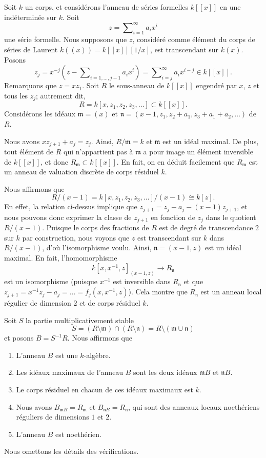 \medskip\noindent
Soit $k$ un corps, et considérons l'anneau de séries formelles
$k[[x]]$ en une indéterminée sur $k$. Soit
$$
z = \sum\nolimits_{i = 1}^\infty a_i x^i
$$
une série formelle. Nous supposons que $z$, considéré comme élément du corps
de séries de Laurent $k((x)) = k[[x]][1/x]$, est transcendant sur $k(x)$.
Posons
$$
z_j
=
x^{-j}(z - \sum\nolimits_{i = 1, \ldots, j - 1} a_i x^i)
=
\sum\nolimits_{i = j}^\infty a_i x^{i - j}
\in k[[x]].
$$
Remarquons que $z = xz_1$.
Soit $R$ le sous-anneau de $k[[x]]$ engendré par $x$, $z$ et tous les
$z_j$; autrement dit,
$$
R = k[x, z_1, z_2, z_3, \ldots ] \subset k[[x]].
$$
Considérons les idéaux $\mathfrak m = (x)$ et
$\mathfrak n = (x - 1, z_1, z_2 + a_1, z_3 + a_1 + a_2, \ldots)$ de $R$.

\medskip\noindent
Nous avons $xz_{j + 1} + a_j = z_j$. Ainsi, $R/\mathfrak m = k$
et $\mathfrak m$ est un idéal maximal. De plus, tout élément de $R$
qui n'appartient pas à $\mathfrak m$ a pour image un élément inversible de $k[[x]]$, et donc
$R_{\mathfrak m} \subset k[[x]]$. En fait, on en déduit facilement
que $R_{\mathfrak m}$ est un anneau de valuation discrète de corps
résiduel $k$.

\medskip\noindent
Nous affirmons que
$$
R/(x - 1) =
k[x, z_1, z_2, z_3, \ldots ]/(x - 1)
\cong
k[z].
$$
En effet, la relation ci-dessus implique que
$z_{j + 1} = z_j - a_j - (x - 1)z_{j + 1}$, et nous pouvons donc
exprimer la classe de $z_{j + 1}$ en fonction de $z_j$ dans
le quotient $R/(x - 1)$. Puisque le corps des fractions de $R$
est de degré de transcendance $2$ sur $k$ par construction, nous voyons que $z$ est
transcendant sur $k$ dans $R/(x - 1)$, d'où l'isomorphisme voulu.
Ainsi, $\mathfrak n = (x - 1, z)$ est un idéal maximal. En fait,
l'homomorphisme
$$
k[x, x^{-1}, z]_{(x - 1, z)} \longrightarrow R_{\mathfrak n}
$$
est un isomorphisme (puisque $x^{-1}$ est inversible dans $R_{\mathfrak n}$
et que $z_{j + 1} = x^{-1}z_j - a_j = \ldots = f_j(x, x^{-1}, z)$).
Cela montre que $R_{\mathfrak n}$ est un anneau local régulier
de dimension $2$ et de corps résiduel $k$.

\medskip\noindent
Soit $S$ la partie multiplicativement stable
$$
S =
(R \setminus \mathfrak m) \cap (R \setminus \mathfrak n) =
R \setminus (\mathfrak m \cup \mathfrak n)
$$
et posons $B = S^{-1}R$. Nous affirmons que
\begin{enumerate}
\item L'anneau $B$ est une $k$-algèbre.
\item Les idéaux maximaux de l'anneau $B$ sont les deux idéaux
$\mathfrak mB$ et $\mathfrak nB$.
\item Le corps résiduel en chacun de ces idéaux maximaux est $k$.
\item Nous avons $B_{\mathfrak mB} = R_{\mathfrak m}$
et $B_{\mathfrak nB} = R_{\mathfrak n}$,
qui sont des anneaux locaux noethériens réguliers de dimensions $1$ et $2$.
\item L'anneau $B$ est noethérien.
\end{enumerate}
Nous omettons les détails des vérifications.


